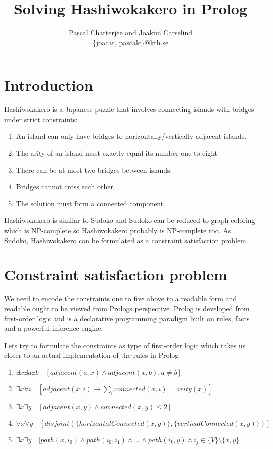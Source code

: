 \documentclass[a4paper,12pt]{article}
\title{Solving Hashiwokakero in Prolog}
\author{Pascal Chatterjee and Joakim Carselind \\ \small{\{joacar, pascalc\}@kth.se}}
\begin{document}
\maketitle

\section*{Introduction}
Hashiwokakero is a Japanese puzzle that involves connecting islands with bridges under strict constraints:
\begin{enumerate}
	\item An island can only have bridges to horizontally/vertically adjacent islands.
	\item The arity of an island must exactly equal its number one to eight
	\item There can be at most two bridges between islands.
	\item Bridges cannot cross each other.
	\item The solution must form a connected component.
\end{enumerate}
Hashiwokakero is similar to Sudoko and Sudoko can be reduced to graph coloring which is NP-complete so Hashiwokakero probably is NP-complete too. As Sudoko, Hashiwokakero can be formulated as a constraint satisfaction problem.  

\section*{Constraint satisfaction problem}
We need to encode the constraints one to five above to a readable form and readable ought to be viewed from Prologs perspective. Prolog is developed from first-order logic and is a declarative programming paradigm built on rules, facts and a powerful inference engine.

Lets try to formulate the constraints as type of first-order logic which takes us closer to an actual implementation of the rules in Prolog

\begin{enumerate}
	\item $\exists x\exists a \exists b \quad [adjacent(a,x) \land adjacent(x,b), a \neq b]$
	\item $\exists x \forall i \quad [adjacent(x,i) \rightarrow \sum_i connected(x,i) = arity(x)]$
	\item $\exists x \exists y \quad [adjacent(x,y) \land connected(x,y) \leq 2]$
	\item $\forall x \forall y \quad [disjoint(\{horizontalConnected(x,y)\}, \{verticalConnected(x,y)\})]$
	\item $\exists x \exists y \quad [path(x,i_0) \land path(i_0,i_1) \land \ldots \land path(i_k,y) \land i_j \in \{V\} \setminus \{x,y\}$
\end{enumerate}
\end{document}
